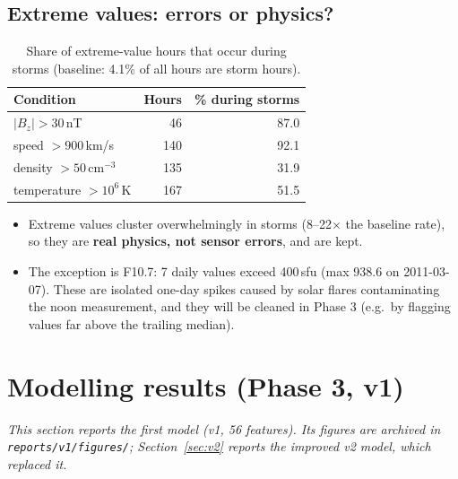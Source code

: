 \documentclass[11pt,a4paper]{article}
\newcommand{\code}[1]{\texttt{#1}}
\begin{document}
\subsection{Extreme values: errors or physics?}
\begin{table}[H]\centering\small
\caption{Share of extreme-value hours that occur during storms (baseline: 4.1\% of all hours are storm hours).}
\begin{tabular}{lrr}\toprule
Condition & Hours & \% during storms\\\midrule
$|B_z|>30$\,nT & 46 & 87.0\\
speed $>900$\,km/s & 140 & 92.1\\
density $>50$\,cm$^{-3}$ & 135 & 31.9\\
temperature $>10^6$\,K & 167 & 51.5\\\bottomrule
\end{tabular}\end{table}
\begin{itemize}
\item Extreme values cluster overwhelmingly in storms (8--22$\times$ the baseline rate), so they are
\textbf{real physics, not sensor errors}, and are kept.
\item The exception is F10.7: 7 daily values exceed 400\,sfu (max 938.6 on 2011-03-07). These are isolated
one-day spikes caused by solar flares contaminating the noon measurement, and they will be cleaned in Phase 3
(e.g.\ by flagging values far above the trailing median).
\end{itemize}

\section{Modelling results (Phase 3, v1)}\label{sec:results}
\textit{This section reports the first model (v1, 56 features). Its figures are archived in \code{reports/v1/figures/}; Section~\ref{sec:v2} reports the improved v2 model, which replaced it.}
\end{document}
